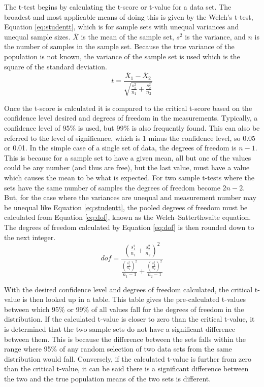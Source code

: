     The t-test begins by calculating the t-score or t-value for a data set.
    The broadest and most applicable means of doing this is given by the Welch's t-test, Equation \ref{eq:studentt}, which is for sample sets with unequal variances and unequal sample sizes.
    $\overline{X}$ is the mean of the sample set, $s^2$ is the variance, and $n$ is the number of samples in the sample set.
    Because the true variance of the population is not known, the variance of the sample set is used which is the square of the standard deviation.
    \begin{equation}
        \label{eq:studentt}
        t=\frac{\overline{X}_1 - \overline{X}_2}{\sqrt{\frac{s^2_1}{n_1}+\frac{s_2^2}{n_2}}}
    \end{equation}

    Once the t-score is calculated it is compared to the critical t-score based on the confidence level desired and degrees of freedom in the measurements.
    Typically, a confidence level of 95\% is used, but 99\% is also frequently found.
    This can also be referred to the level of significance, which is 1 minus the confidence level, so 0.05 or 0.01.
    In the simple case of a single set of data, the degrees of freedom is $n-1$.
    This is because for a sample set to have a given mean, all but one of the values could be any number (and thus are free), but the last value, must have a value which causes the mean to be what is expected.
    For two sample t-tests where the sets have the same number of samples the degrees of freedom become $2n-2$.
    But, for the case where the variances are unequal and measurement number may be unequal like Equation \ref{eq:studentt}, the pooled degrees of freedom must be calculated from Equation \ref{eq:dof}, known as the Welch–Satterthwaite equation.
    The degrees of freedom calculated by Equation \ref{eq:dof} is then rounded down to the next integer.
    \begin{equation}
        \label{eq:dof}
        dof=\frac{\left(\frac{s_1^2}{n_1}+\frac{s_2^2}{n_2}\right)^2}{\frac{\left(\frac{s_1^2}{n_1}\right)^2}{n_1-1}+\frac{\left(\frac{s_2^2}{n_2}\right)^2}{n_2-1}}
    \end{equation}

    With the desired confidence level and degrees of freedom calculated, the critical t-value is then looked up in a table.
    This table gives the pre-calculated t-values between which 95\% or 99\% of all values fall for the degrees of freedom in the distribution.
    If the calculated t-value is closer to zero than the critical t-value, it is determined that the two sample sets do not have a significant difference between them.
    This is because the difference between the sets falls within the range where 95\% of any random selection of two data sets from the same distribution would fall.
    Conversely, if the calculated t-value is further from zero than the critical t-value, it can be said there is a significant difference between the two and the true population means of the two sets is different.

